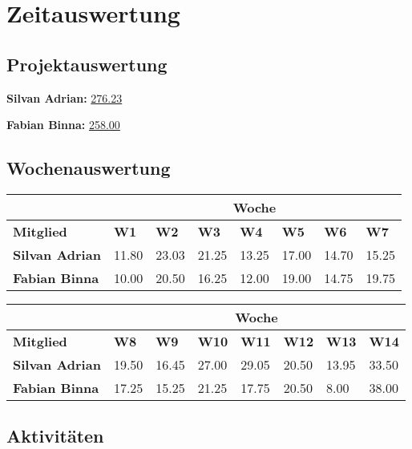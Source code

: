 \chapter{Zeitauswertung}

\section{Projektauswertung}

\textbf{Silvan Adrian:} \underline{276.23}

\textbf{Fabian Binna:} \underline{258.00}

\section{Wochenauswertung}

\begin{table}[h]
\begin{tabularx}{\linewidth}{l X X X X X X X}
& \multicolumn{7}{c}{\textbf{Woche}}\\
\hline
\textbf{Mitglied} & \textbf{W1} & \textbf{W2} & \textbf{W3} & \textbf{W4} & \textbf{W5} & \textbf{W6} & \textbf{W7} \\
\hline
\textbf{Silvan Adrian} & 11.80  & 23.03  & 21.25 & 13.25 & 17.00 & 14.70 & 15.25  \\
\hline
\textbf{Fabian Binna} & 10.00 & 20.50 & 16.25 & 12.00 & 19.00 & 14.75 & 19.75 \\
\end{tabularx}
\end{table}
\begin{table}[h]
\begin{tabularx}{\linewidth}{l X X X X X X X}
 & \multicolumn{7}{c}{\textbf{Woche}}\\
\hline
\textbf{Mitglied} & \textbf{W8} & \textbf{W9} & \textbf{W10} & \textbf{W11} & \textbf{W12} &
 \textbf{W13} & \textbf{W14}\\
\hline
\textbf{Silvan Adrian} & 19.50 & 16.45 & 27.00 & 29.05  & 20.50  & 13.95 & 33.50 \\
\hline
\textbf{Fabian Binna} & 17.25 & 15.25 & 21.25 & 17.75 & 20.50 & 8.00 & 38.00 \\
\end{tabularx}
\end{table}

\section{Aktivitäten}

